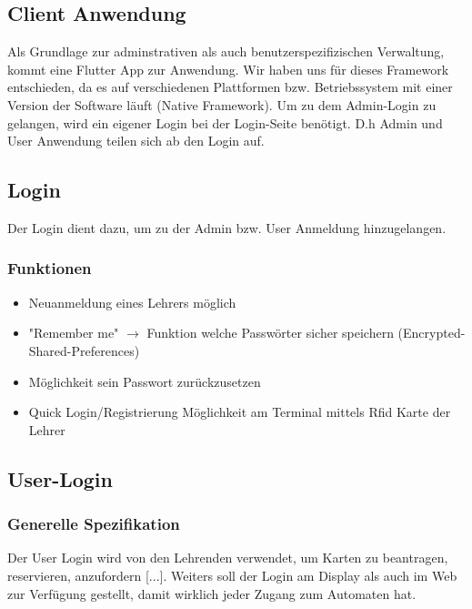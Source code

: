 \documentclass[a4paper]{article}
\begin{document}
\newpage

\subsection{Client Anwendung}
Als Grundlage zur adminstrativen als auch benutzerspezifizischen Verwaltung, kommt eine Flutter App zur Anwendung. Wir haben uns für dieses Framework entschieden, da es auf verschiedenen Plattformen bzw. Betriebssystem mit einer Version der Software läuft (Native Framework). Um zu dem Admin-Login zu gelangen, wird ein eigener Login bei der Login-Seite benötigt. D.h Admin und User Anwendung teilen sich ab den Login auf.

\subsection{Login}
Der Login dient dazu, um zu der Admin bzw. User Anmeldung hinzugelangen.
\subsubsection{Funktionen}
\begin{itemize}
  \item Neuanmeldung eines Lehrers möglich
  \item "Remember me" $\rightarrow$ Funktion welche Passwörter sicher speichern (Encrypted-Shared-Preferences)
  \item Möglichkeit sein Passwort zurückzusetzen  
  \item Quick Login/Registrierung Möglichkeit am Terminal mittels Rfid Karte der Lehrer 
\end{itemize}

\subsection{User-Login}
\subsubsection{Generelle Spezifikation}
Der User Login wird von den Lehrenden verwendet, um Karten zu beantragen, reservieren, anzufordern [...]. Weiters soll der Login am Display als auch im Web zur Verfügung gestellt, damit wirklich jeder Zugang zum Automaten hat. 
\end{document}

